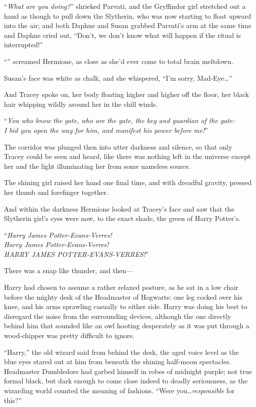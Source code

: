 “\emph{What are you doing?}” shrieked Parvati, and the Gryffindor girl stretched out a hand as though to pull down the Slytherin, who was now starting to float upward into the air; and both Daphne and Susan grabbed Parvati’s arm at the same time and Daphne cried out, “Don’t, we don’t know what will happen if the ritual is interrupted!”

“” screamed Hermione, as close as she’d ever come to total brain meltdown.

Susan’s face was white as chalk, and she whispered, “I’m sorry, Mad-Eye…”

And Tracey spoke on, her body floating higher and higher off the floor, her black hair whipping wildly around her in the chill winds.

“\emph{You who know the gate, who are the gate, the key and guardian of the gate:\\ I bid you open the way for him, and manifest his power before me!}”

The corridor was plunged then into utter darkness and silence, so that only Tracey could be seen and heard, like there was nothing left in the universe except her and the light illuminating her from some nameless source.

The shining girl raised her hand one final time, and with dreadful gravity, pressed her thumb and forefinger together.

And within the darkness Hermione looked at Tracey’s face and saw that the Slytherin girl’s eyes were now, to the exact shade, the green of Harry Potter’s.

“\emph{Harry James Potter-Evans-Verres!\\
Harry James Potter-Evans-Verres!\\
HARRY JAMES POTTER-EVANS-VERRES!}”

There was a snap like thunder, and then—

\later

Harry had chosen to assume a rather relaxed posture, as he sat in a low chair before the mighty desk of the Headmaster of Hogwarts: one leg cocked over his knee, and his arms sprawling casually to either side. Harry was doing his best to disregard the noise from the surrounding devices, although the one directly behind him that sounded like an owl hooting desperately as it was put through a wood-chipper was pretty difficult to ignore.

“Harry,” the old wizard said from behind the desk, the aged voice level as the blue eyes stared out at him from beneath the shining half-moon spectacles. Headmaster Dumbledore had garbed himself in robes of midnight purple; not true formal black, but dark enough to come close indeed to deadly seriousness, as the wizarding world counted the meaning of fashions. “Were you…\emph{responsible} for this?”

